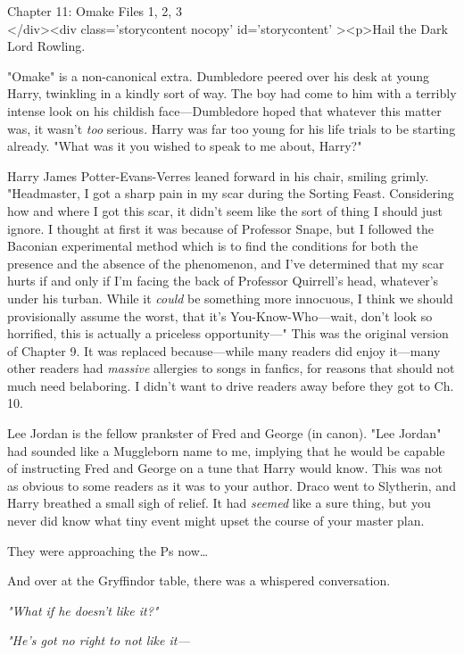 
Chapter 11: Omake Files 1, 2, 3\\
</div><div  class='storycontent nocopy' id='storycontent' ><p>Hail the Dark Lord Rowling.

"Omake" is a non-canonical extra.
\sbreak
Dumbledore peered over his desk at young Harry, twinkling in a kindly sort of way. The boy had come to him with a terribly intense look on his childish face---Dumbledore hoped that whatever this matter was, it wasn't \emph{too} serious. Harry was far too young for his life trials to be starting already. "What was it you wished to speak to me about, Harry?"

Harry James Potter-Evans-Verres leaned forward in his chair, smiling grimly. "Headmaster, I got a sharp pain in my scar during the Sorting Feast. Considering how and where I got this scar, it didn't seem like the sort of thing I should just ignore. I thought at first it was because of Professor Snape, but I followed the Baconian experimental method which is to find the conditions for both the presence and the absence of the phenomenon, and I've determined that my scar hurts if and only if I'm facing the back of Professor Quirrell's head, whatever's under his turban. While it \emph{could} be something more innocuous, I think we should provisionally assume the worst, that it's You-Know-Who---wait, don't look so horrified, this is actually a priceless opportunity---"
\sbreak
This was the original version of Chapter 9. It was replaced because---while many readers did enjoy it---many other readers had \emph{massive} allergies to songs in fanfics, for reasons that should not much need belaboring. I didn't want to drive readers away before they got to Ch. 10.

Lee Jordan is the fellow prankster of Fred and George (in canon). "Lee Jordan" had sounded like a Muggleborn name to me, implying that he would be capable of instructing Fred and George on a tune that Harry would know. This was not as obvious to some readers as it was to your author.
\sbreak
Draco went to Slytherin, and Harry breathed a small sigh of relief. It had \emph{seemed} like a sure thing, but you never did know what tiny event might upset the course of your master plan.

They were approaching the Ps now{\ldots}

And over at the Gryffindor table, there was a whispered conversation.

\emph{"What if he doesn't like it?"}

\emph{"He's got no right to not like it---}

